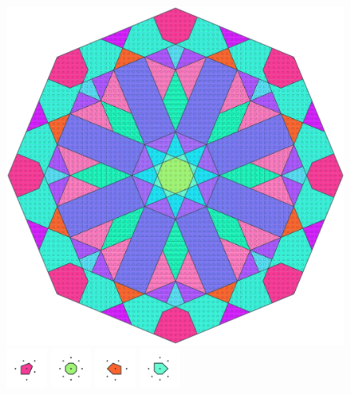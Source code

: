 \documentclass[text.tex]{subfiles}
\begin{document}
\clearpage
\pagestyle{fancy}
\fancyhf{}
\begin{figure}[h!]
\centering
\includegraphics[width=1\textwidth]{img/results/octagon/octagon_112132_(-5_3alpha_2).pdf}
\includegraphics[width=0.12\textwidth]{img/results/octagon/octagon_112132_(-5_3alpha_2)_001.pdf}
\includegraphics[width=0.12\textwidth]{img/results/octagon/octagon_112132_(-5_3alpha_2)_002.pdf}
\includegraphics[width=0.12\textwidth]{img/results/octagon/octagon_112132_(-5_3alpha_2)_003.pdf}
\includegraphics[width=0.12\textwidth]{img/results/octagon/octagon_112132_(-5_3alpha_2)_004.pdf}

\end{figure}
\end{document}
